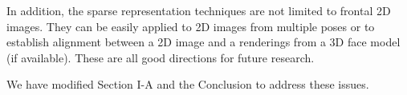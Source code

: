 \documentclass[11pt]{article}
\begin{document}
\begin{enumerate}
In addition, the sparse representation techniques are not limited to frontal 2D images.
They can be easily applied to 2D images from multiple poses or to establish alignment
between a 2D image and a renderings from a 3D face model (if available). These are all good directions
for future research.

We have modified Section I-A and the Conclusion to address these issues.

\end{enumerate}
\end{document}
